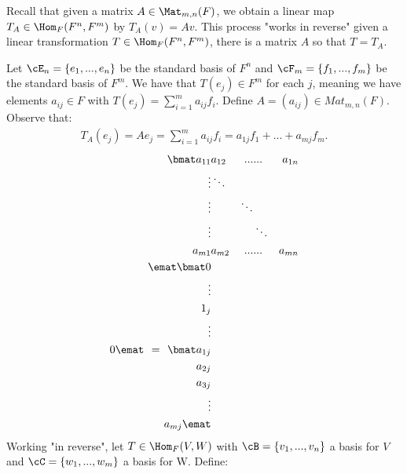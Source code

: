     \begin{example}\label{example:linear-transformations-as-matrices}
        Recall that given a matrix $A \in \Mat_{m,n}(F)$, we obtain a linear map $T_A \in \Hom_F{(F^n, F^m)}$ by $T_A(v) = Av$. This process "works in reverse" \textemdash given a linear transformation $T \in \Hom_F{(F^n,F^m)}$, there is a matrix $A$ so that $T = T_A$.

        Let $\cE_n  = \{e_1,...,e_n\}$ be the standard basis of $F^n$ and $\cF_m = \{f_1,...,f_m\}$ be the standard basis of $F^m$. We have that $T(e_j) \in F^m$ for each $j$, meaning we have elements $a_{ij} \in F$ with $T(e_j) = \sum_{i=1}^m a_{ij}f_i$. Define $A = (a_{ij}) \in Mat_{m,n}(F)$. Observe that:
            \begin{equation*}
            \begin{split}
                T_A(e_j) = A e_j = \sum_{i = 1}^m a_{ij}f_i = a_{1j}f_1 + ... + a_{mj}f_m.
            \end{split}
            \end{equation*}
            \begin{equation*}
            \begin{split}
                \bmat 
                a_{11} & a_{12} & ... & ... &a_{1n} \\
                \vdots & \ddots & & \\
                \vdots & & \ddots & \\
                \vdots & & & \ddots \\
                a_{m1} & a_{m2} & ... & ... &a_{mn} \\
                \emat
                \bmat
                0 \\ \vdots \\ 1_j \\ \vdots \\ 0 
                \emat \hspace{4pt}=\hspace{4pt}
                \bmat
                a_{1j} \\ a_{2j} \\ a_{3j} \\ \vdots \\  a_{mj}
                \emat
            \end{split}
            \end{equation*}
        Working "in reverse", let $T \in \Hom_F{(V,W)}$ with $\cB = \{v_1,...,v_n\}$ a basis for $V$ and $\cC = \{w_1,...,w_m\}$ a basis for W. Define:

\end{example}
